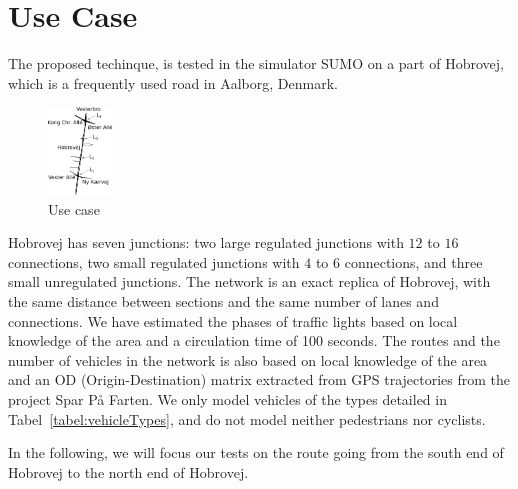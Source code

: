 \section{Use Case}\label{sec:UseCase}
The proposed techinque, \tech is tested in the simulator SUMO on a part of Hobrovej, which is a frequently used road in Aalborg, Denmark.

\begin{figure}[htb]
\centering
\includegraphics[width=0.15\textwidth]{../images/Hobrovej.png}
\caption{Use case}
\label{fig:Introduction:hobro}
\end{figure}

Hobrovej has seven junctions: two large regulated junctions with $12$ to $16$ connections, two small regulated junctions with $4$ to $6$ connections, and three small unregulated junctions.
The network is an exact replica of Hobrovej, with the same distance between sections and the same number of lanes and connections. 
We have estimated the phases of traffic lights based on local knowledge of the area and a circulation time of 100 seconds.
The routes and the number of vehicles in the network is also based on local knowledge of the area and an OD (Origin-Destination) matrix extracted from GPS trajectories from the project Spar På Farten\cite{}.
We only model vehicles of the types detailed in Tabel~\ref{tabel:vehicleTypes}, and do not model neither pedestrians nor cyclists.

In the following, we will focus our tests on the route going from the south end of Hobrovej to the north end of Hobrovej.
